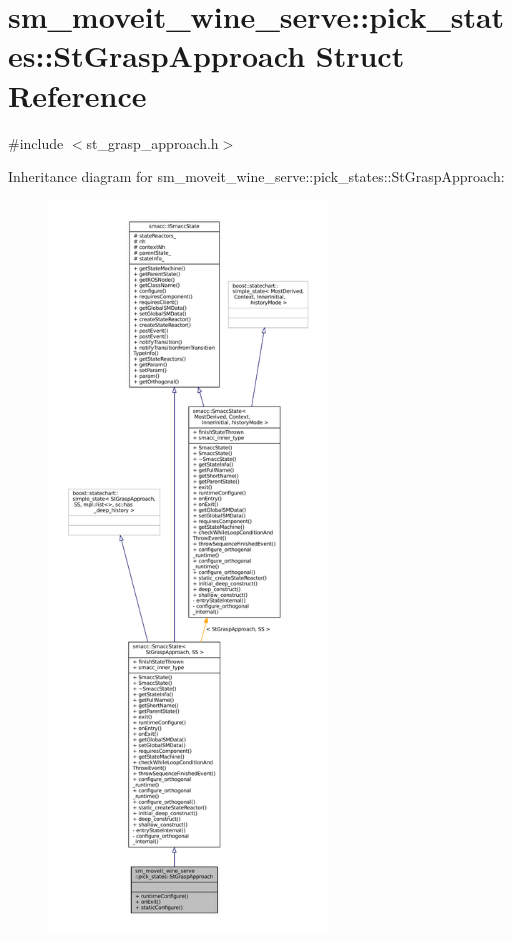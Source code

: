 \hypertarget{structsm__moveit__wine__serve_1_1pick__states_1_1StGraspApproach}{}\section{sm\+\_\+moveit\+\_\+wine\+\_\+serve\+:\+:pick\+\_\+states\+:\+:St\+Grasp\+Approach Struct Reference}
\label{structsm__moveit__wine__serve_1_1pick__states_1_1StGraspApproach}


{\ttfamily \#include $<$st\+\_\+grasp\+\_\+approach.\+h$>$}



Inheritance diagram for sm\+\_\+moveit\+\_\+wine\+\_\+serve\+:\+:pick\+\_\+states\+:\+:St\+Grasp\+Approach\+:
\nopagebreak
\begin{figure}[H]
\begin{center}
\leavevmode
\includegraphics[height=550pt]{structsm__moveit__wine__serve_1_1pick__states_1_1StGraspApproach__inherit__graph}
\end{center}
\end{figure}


